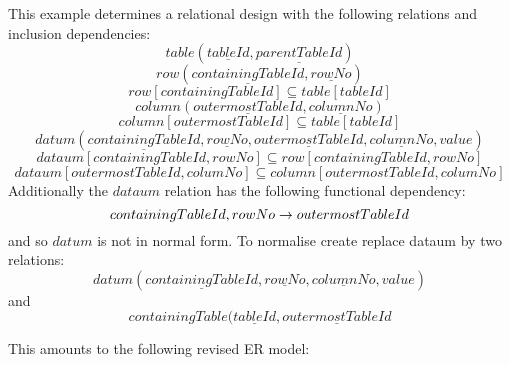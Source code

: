 This example determines a relational design with the following
relations and inclusion dependencies:
\begin{equation}
table(\underline{tableId},
\underline{parentTableId})
\end{equation}
\begin{equation}
row(
\underline{containingTableId},
\underline{rowNo}
)
\end{equation}
\begin{equation}
row[containingTableId] \subseteq table[tableId]
\end{equation}
\begin{equation}
column(\underline{outermostTableId},
\underline{columnNo})
\end{equation}
\begin{equation}
column[outermostTableId] \subseteq table[tableId]
\end{equation}
\begin{equation}
datum(\underline{containingTableId},
\underline{rowNo},
\underline{outermostTableId},
\underline{columnNo},value)
\end{equation}
\begin{equation}
dataum[containingTableId,rowNo] \subseteq row[containingTableId,rowNo]
\end{equation}
\begin{equation}
dataum[outermostTableId,columNo] \subseteq column[outermostTableId,columNo]
\end{equation}
Additionally the $dataum$ relation has the following functional dependency:
\begin{equation}
containingTableId,rowNo \rightarrow outermostTableId
\end{equation}
and so $datum$ is not in normal form. To normalise create replace dataum 
by two relations:
\begin{equation}
datum(\underline{containingTableId},
\underline{rowNo},
\underline{columnNo},value)
\end{equation}
and
\begin{equation}
containingTable(\underline{tableId},
\underline{outermostTableId}
\end{equation}

This amounts to the following revised ER model:

